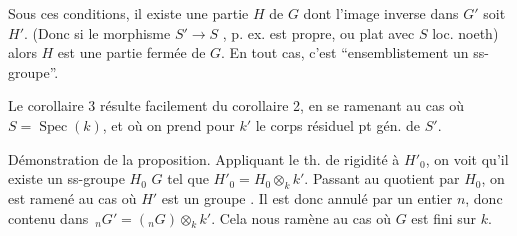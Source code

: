 Sous ces conditions, il existe une partie
\margin{\rule[-5\baselineskip]{0.35pt}{5\baselineskip}} $H$ de $G$ dont l'image inverse dans
$G'$ soit $H'$. (Donc si le morphisme
$S'\longrightarrow S$ 
, 
p. ex. est propre, ou plat avec $S$ loc. noeth)
alors $H$ est une partie fermée de $G$.
En tout cas, c'est ``ensemblistement un
ss-groupe''.


Le corollaire 3 résulte facilement du
corollaire 2, en se ramenant au cas où
$S=\operatorname{Spec}(k)$, et où on prend pour $k'$ le corps
 résiduel  pt gén. de $S'$.

Démonstration de la proposition.  Appliquant le th. de
rigidité à $H'_0$, on voit qu'il
existe un ss-groupe $H_0$  $G$ tel que
$H'_0=H_0\otimes_k k'$. Passant au quotient par
$H_0$, on est ramené au cas où $H'$ est
un groupe . Il est donc annulé
par un entier $n$, donc contenu
dans $\,{}_nG'=({}_nG)\otimes_k k'$. Cela nous ramène
au cas où $G$ est fini sur $k$. 
